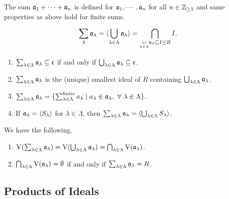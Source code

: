 \begin{remark}
    The sum $\mathfrak{a}_1 + \cdots + \mathfrak{a}_n$ is defined for $\mathfrak{a}_1,\cdots,\mathfrak{a}_n$ for all $n \in \mathbb{Z}_{\geq 3}$ and same properties as above hold for finite sums.
\end{remark}

\begin{definition}\label{1.34}
    \[\sum_{\lambda} \mathfrak{a}_\lambda = \langle \bigcup_{\lambda \in \Lambda} \mathfrak{a}_\lambda \rangle = \bigcap_{\underset {\lambda \in \Lambda} \cup \mathfrak{a}_\lambda \subseteq I \leq R} I.\]
\end{definition}

\begin{fact}\label{1.35}
    \begin{enumerate}
        \item $\sum_{\lambda \in \Lambda} \mathfrak{a}_\lambda \subseteq \mathfrak{c}$ if and only if $\bigcup_{\lambda \in \Lambda} \mathfrak{a}_\lambda \subseteq \mathfrak{c}$.
        \item $\sum_{\lambda \in \Lambda} \mathfrak{a}_\lambda$ is the (unique) smallest ideal of $R$ containing $\bigcup_{\lambda \in \Lambda} \mathfrak{a}_\lambda$.
        \item $\sum_{\lambda \in \Lambda} \mathfrak{a}_\lambda = \{\sum_{\lambda \in \Lambda}^{\text{finite}}a_\lambda \mid a_\lambda \in \mathfrak{a}_\lambda, \ \forall \  \lambda \in \Lambda\}$.
        \item If $\mathfrak{a}_\lambda = \langle S_\lambda \rangle$ for $\lambda \in \Lambda$, then $\sum_{\lambda \in \Lambda} \mathfrak{a}_\lambda = \langle \bigcup_{\lambda \in \Lambda}S_\lambda \rangle$.
    \end{enumerate}
\end{fact}

\begin{fact}\label{1.36}
    We have the following.
    \begin{enumerate}
        \item\label{1.36a} $\operatorname{V}(\sum_{\lambda \in \Lambda} \mathfrak{a}_\lambda) = \operatorname{V}(\bigcup_{\lambda \in \Lambda} \mathfrak{a}_\lambda) = \bigcap_{\lambda \in \Lambda} \operatorname{V}(\mathfrak{a}_\lambda)$.
        \item\label{1.36b} $\bigcap_{\lambda \in \Lambda} \operatorname{V}(\mathfrak{a}_\lambda) = \emptyset$ if and only if $\sum_{\lambda \in \Lambda} \mathfrak{a}_\lambda = R$.
    \end{enumerate}
\end{fact}

\subsection*{Products of Ideals}

